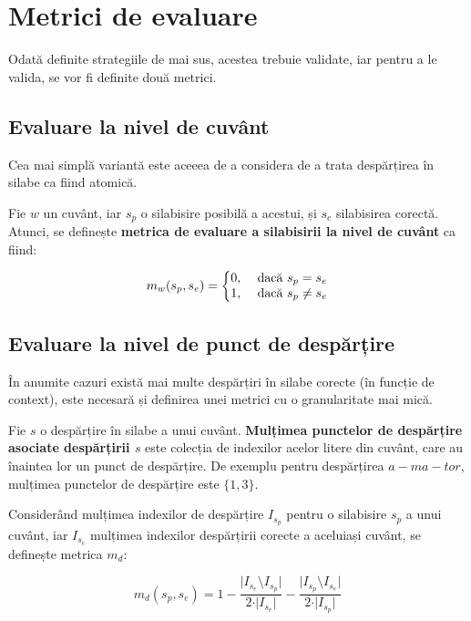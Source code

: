 \section{Metrici de evaluare}

Odată definite strategiile de mai sus, acestea trebuie validate, iar pentru a le valida, se vor fi definite două metrici.

\subsection{Evaluare la nivel de cuvânt}

Cea mai simplă variantă este aceeea de a considera de a trata despărțirea în silabe ca fiind atomică.

\begin{defi} Fie $w$ un cuvânt, iar $s_p$ o silabisire posibilă a acestui, și $s_e$ silabisirea corectă. Atunci, se definește \textbf{metrica de evaluare a silabisirii la nivel de cuvânt} ca fiind:

\begin{equation}
m_w(s_p,s_e) = \left\{
\begin{matrix}
0, 	& $ dacă $ s_p=s_e\\ 
1,	& $ dacă $ s_p\neq s_e \\
\end{matrix}
\right. 
\end{equation}
\end{defi}

\subsection{Evaluare la nivel de punct de despărțire}

În anumite cazuri există mai multe despărțiri în silabe corecte (în funcție de context), este necesară și definirea unei metrici cu o granularitate mai mică.

\begin{defi}
Fie $s$ o despărțire în silabe a unui cuvânt. \textbf{Mulțimea punctelor de despărțire asociate despărțirii $s$} este colecția de indexilor acelor litere din cuvânt, care au înaintea lor un punct de despărțire. De exemplu pentru despărțirea $a-ma-tor$, mulțimea punctelor de despărțire este $\{1,3\}$.
\end{defi}


\begin{defi}
Considerând mulțimea indexilor de despărțire $I_{s_p}$ pentru o silabisire $s_p$ a unui cuvânt, iar $I_{s_e}$ mulțimea indexilor despărțirii corecte a aceluiași cuvânt, se definește metrica $m_d$:

\begin{equation}
m_d(s_p,s_e) = 1- \frac{\vert I_{s_e} \setminus I_{s_p} \vert}{2 \cdot \vert I_{s_e} \vert} - \frac{\vert I_{s_p} \setminus I_{s_e} \vert}{2 \cdot \vert I_{s_p} \vert}
\end{equation}
\end{defi}

